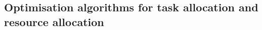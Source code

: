 \subsection{Optimisation algorithms for task allocation and resource allocation}
\label{section:algorithm_summaries}
\newcommand{\varAction}[2]{\varSymbol{a}{#1}{#2}}
\newcommand{\functionExec}[2]{
	\ifx &#1&
	\texttt{exec}(\varAtomicTask{}{})
	\else
	\texttt{exec}(#1, #2)
	\fi
}
\newcommand{\functionAlloc}[2]{
	\ifx &#1&
	\texttt{alloc}(\varAtomicTask{}{}, \varAgent{}{})
	\else
	\texttt{alloc}(#1, #2)
	\fi
}
\newcommand{\functionInfo}[2]{
	\ifx &#1&
	\texttt{info}(\varAgent{}{})
	\else
	\texttt{info}(#1)
	\fi
}
\newcommand{\functionLink}[2]{
	\ifx &#1&
	\texttt{link}(\varAgent{}{})
	\else
	\texttt{link}(#1)
	\fi
}
\newcommand{\functionATARIA}[2]{
	\functionSignature{
		\texttt{ataria}
	}{
		\varAgent{}{}, \varAtomicTask{}{}
	}
}	
\newcommand{\varTaskValue}[2]{taskval}
\newcommand{\functionATARIAAction}[2]{
\ifx &#1&
	\functionSignature{\texttt{ataria-action}}{\varAgent{}{}, \varAtomicTask{}{}}
\else
	\functionSignature{\texttt{ataria-action}}{\varAgent{#1}{}, \varAtomicTask{#2}{}}
\fi
}	
\newcommand{\functionATARIAUpdate}[2]{
\ifx &#1&
\functionSignature{\texttt{ataria-update}}{\varAgent{}{}, \varTaskValue{}{\varAtomicTask{}{}, \varTaskValue{}{}}}
\else
\functionSignature{\texttt{ataria-update}}{\varAgent{#1}{}, \varAtomicTask{#2}{}, \varTaskValue{}{}}
\fi
}	
\newcommand{\formalATARIA}[2]{
	\functionFormal{\texttt{ataria}_{\varAgent{}{}}}
	{\setAtomicTask{}{} \times \setAgents{}{}}
	{
		\texttt{exec}(\setAtomicTask{}{})
		\times \texttt{alloc}(\setAtomicTask{}{}, \setAgents{}{})
		\times \texttt{info}(\setAgents{}{})
		\times \texttt{link}(\setAgents{}{})
	}
}
\newcommand{\functionMGRAOWeighting}[2]{\texttt{mgrao-weight}(\varAtomicTask{}{}, \varAgent{self}{})}
\newcommand{\formalMGRAOWeighting}[2]{
	\functionFormal{\texttt{mgrao-weight}_{\varAgent{}{}}}
	{\setAtomicTask{}{} \times \setRealNumbers{}{}}
	{
		\setRealNumbers{}{}
	}
}
\newcommand{\functionMGRAOUpdate}[2]{
\ifx &#1&
	\functionSignature{\texttt{mgrao-update}}{\varAgent{}{}, \varAtomicTask{}{}, \functionTaskAbsoluteValue{}{}}
\else
\functionSignature{\texttt{mgrao-update}}{\varAgent{}{}, \varAtomicTask{}{}, \functionTaskAbsoluteValue{}{}}
\fi
}
\newcommand{\formalMGRAOUpdate}[2]{
	\functionFormal{\texttt{mgrao-update}_{\varAgent{}{}}}
	{\setAtomicTask{}{} \times \setRealNumbers{}{}}
	{
		\setRealNumbers{}{}
	}
}

